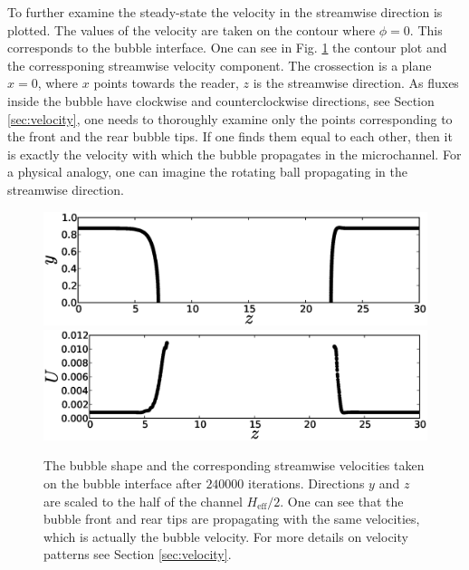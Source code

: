 \documentclass{article}
\begin{document}
To further examine the steady-state the velocity in the streamwise direction is plotted. The values
of the velocity are taken on the contour where $\phi=0$. This corresponds
 to the bubble interface. One can see in Fig. \ref{fig:velocity:contour} the contour plot and the
corressponing streamwise velocity
component. The crossection is a plane $x=0$, where $x$ points
towards the reader, $z$ is the streamwise direction. As fluxes inside the bubble have
clockwise and counterclockwise directions, see Section \ref{sec:velocity}, one needs to thoroughly
examine only the points corresponding to the front and the rear bubble tips. If one finds them equal
to each other, then it is exactly the velocity with which the bubble propagates in the microchannel.
For a physical analogy, one can imagine the rotating ball propagating in the streamwise direction. 
\begin{figure}[ht]
\includegraphics[width=\textwidth]{Figures/velocity_interface_contour.eps}\\
\includegraphics[width=\textwidth]{Figures/velocity_interface_values.eps}\\
\caption{The bubble shape and the corresponding streamwise velocities taken on the bubble
interface after $240000$ iterations. Directions $y$ and $z$ are scaled to the half of the channel
$H_{\mathrm{eff}}/2$. One can see that the bubble front and rear tips are propagating with the
same velocities, which is actually the bubble velocity. For more details on velocity patterns
see Section \ref{sec:velocity}. \label{fig:velocity:contour}}
\end{figure}
\end{document}
